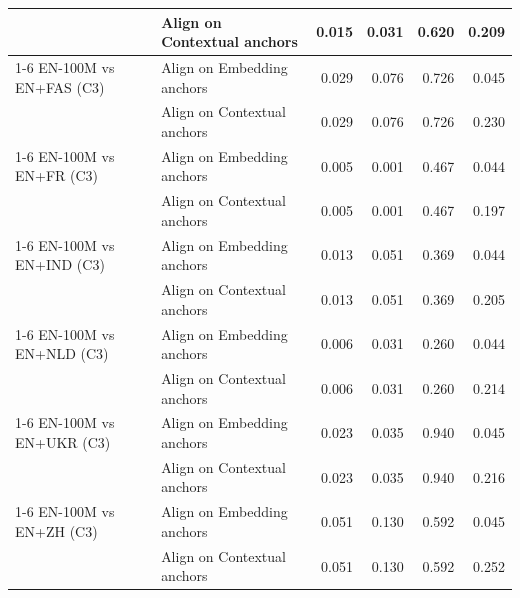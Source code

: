 \begin{tabular}{@{}llrrrr@{}}
 & Align on Contextual anchors & 0.015 & 0.031 & 0.620 & 0.209 \\
\cmidrule(lr){1-6}
EN-100M vs EN+FAS (C3) & Align on Embedding anchors & 0.029 & 0.076 & 0.726 & 0.045 \\
 & Align on Contextual anchors & 0.029 & 0.076 & 0.726 & 0.230 \\
\cmidrule(lr){1-6}
EN-100M vs EN+FR (C3) & Align on Embedding anchors & 0.005 & 0.001 & 0.467 & 0.044 \\
 & Align on Contextual anchors & 0.005 & 0.001 & 0.467 & 0.197 \\
\cmidrule(lr){1-6}
EN-100M vs EN+IND (C3) & Align on Embedding anchors & 0.013 & 0.051 & 0.369 & 0.044 \\
 & Align on Contextual anchors & 0.013 & 0.051 & 0.369 & 0.205 \\
\cmidrule(lr){1-6}
EN-100M vs EN+NLD (C3) & Align on Embedding anchors & 0.006 & 0.031 & 0.260 & 0.044 \\
 & Align on Contextual anchors & 0.006 & 0.031 & 0.260 & 0.214 \\
\cmidrule(lr){1-6}
EN-100M vs EN+UKR (C3) & Align on Embedding anchors & 0.023 & 0.035 & 0.940 & 0.045 \\
 & Align on Contextual anchors & 0.023 & 0.035 & 0.940 & 0.216 \\
\cmidrule(lr){1-6}
EN-100M vs EN+ZH (C3) & Align on Embedding anchors & 0.051 & 0.130 & 0.592 & 0.045 \\
 & Align on Contextual anchors & 0.051 & 0.130 & 0.592 & 0.252 \\
\bottomrule
\end{tabular}
